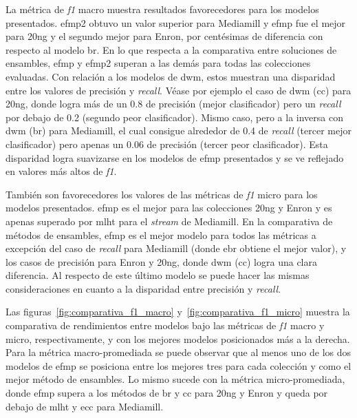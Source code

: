 La métrica de \textit{f1} macro muestra resultados favorecedores para los
modelos presentados. \acrshort{efmp2} obtuvo un valor superior para Mediamill y
\acrshort{efmp} fue el mejor para 20ng y el segundo mejor para Enron, por
centésimas de diferencia con respecto al modelo \acrshort{br}. En lo que
respecta a la comparativa entre soluciones de ensambles, \acrshort{efmp} y
\acrshort{efmp2} superan a las demás para todas las colecciones evaluadas.  Con
relación a los modelos de \acrshort{dwm}, estos muestran una disparidad entre
los valores de precisión y \textit{recall}. Véase por ejemplo el caso de
\acrshort{dwm} (\acrshort{cc}) para 20ng, donde logra más de un 0.8 de precisión
(mejor clasificador) pero un \textit{recall} por debajo de 0.2 (segundo peor
clasificador). Mismo caso, pero a la inversa con \acrshort{dwm} (\acrshort{br})
para Mediamill, el cual consigue alrededor de 0.4 de \textit{recall} (tercer
mejor clasificador) pero apenas un 0.06 de precisión (tercer peor
clasificador).  Esta disparidad logra suavizarse en los modelos de
\acrshort{efmp} presentados y se ve reflejado en valores más altos de
\textit{f1}.

También son favorecedores los valores de las métricas de \textit{f1} micro para
los modelos presentados. \acrshort{efmp} es el mejor para las colecciones 20ng y
Enron y es apenas superado por \acrshort{mlht} para el \textit{stream} de
Mediamill. En la comparativa de métodos de ensambles, \acrshort{efmp} es el
mejor modelo para todos las métricas a excepción del caso de \textit{recall}
para Mediamill (donde \acrshort{ebr} obtiene el mejor valor), y los casos de
precisión para Enron y 20ng, donde \acrshort{dwm} (\acrshort{cc}) logra una
clara diferencia. Al respecto de este último modelo se puede hacer las mismas
consideraciones en cuanto a la disparidad entre precisión y \textit{recall}.

Las figuras~\ref{fig:comparativa_f1_macro} y~\ref{fig:comparativa_f1_micro}
muestra la comparativa de rendimientos entre modelos bajo las métricas de
\textit{f1} macro y micro, respectivamente, y con los mejores modelos
posicionados más a la derecha. Para la métrica macro-promediada se puede
observar que al menos uno de los dos modelos de \acrshort{efmp} se posiciona
entre los mejores tres para cada colección y como el mejor método de ensambles.
Lo mismo sucede con la métrica micro-promediada, donde \acrshort{efmp} supera a
los métodos de \acrshort{br} y \acrshort{cc} para 20ng y Enron y queda por
debajo de \acrshort{mlht} y \acrshort{ecc} para Mediamill.

